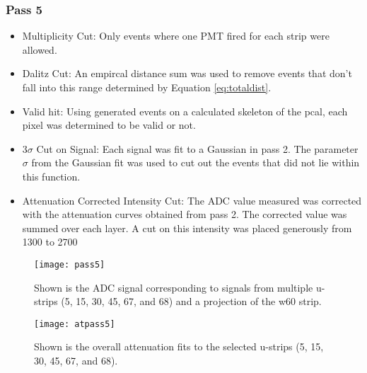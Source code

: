 \subsubsection{Pass 5}
\begin{itemize}
    \item Multiplicity Cut: Only events where one PMT fired for each strip were allowed.
    \item Dalitz Cut: An empircal distance sum was used to remove events that don't fall into this range determined by Equation \ref{eq:totaldist}.
    \item Valid hit: Using generated events on a calculated skeleton of the pcal, each pixel was determined to be valid or not.
    \item 3$\sigma$ Cut on Signal: Each signal was fit to a Gaussian in pass 2. The parameter $\sigma$ from the Gaussian fit was used to cut out the events that did not lie within this function.
    \item Attenuation Corrected Intensity Cut: The ADC value measured was corrected with the attenuation curves obtained from pass 2. The corrected value was summed over each layer. A cut on this intensity was placed generously from 1300 to 2700
\end{itemize}
               
               


\begin{figure}[h]
    \centering
    \texttt{[image: pass5]}
    \caption{Shown is the ADC signal corresponding to signals from multiple u-strips (5, 15, 30, 45, 67, and 68) and a projection of the w60 strip.}
    \label{fig:pass5}
\end{figure}

\begin{figure}[h]
    \centering
    \texttt{[image: atpass5]}
    \caption{Shown is the overall attenuation fits to the selected u-strips (5, 15, 30, 45, 67, and 68).}
    \label{fig:atpass5}
\end{figure}


\FloatBarrier


